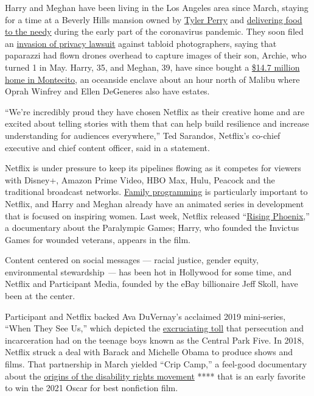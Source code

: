 Harry and Meghan have been living in the Los Angeles area since March,
staying for a time at a Beverly Hills mansion owned by
\href{https://www.nytimes3xbfgragh.onion/2019/02/28/movies/tyler-perry-madea.html}{Tyler
Perry} and
\href{https://www.latimes.com/entertainment-arts/story/2020-04-16/prince-harry-meghan-meals-archie-coronavirus}{delivering
food to the needy} during the early part of the coronavirus pandemic.
They soon filed an
\href{https://twitter.com/eriqgardner/status/1286426962974715906?s=20}{invasion
of privacy lawsuit} against tabloid photographers, saying that paparazzi
had flown drones overhead to capture images of their son, Archie, who
turned 1 in May. Harry, 35, and Meghan, 39, have since bought a
\href{https://variety.com/2020/dirt/heirs-heiresses/meghan-markle-prince-harry-buy-14-7-million-montecito-compound-1234733871/}{\$14.7
million home in Montecito}, an oceanside enclave about an hour north of
Malibu where Oprah Winfrey and Ellen DeGeneres also have estates.

``We're incredibly proud they have chosen Netflix as their creative home
and are excited about telling stories with them that can help build
resilience and increase understanding for audiences everywhere,'' Ted
Sarandos, Netflix's co-chief executive and chief content officer, said
in a statement.

Netflix is under pressure to keep its pipelines flowing as it competes
for viewers with Disney+, Amazon Prime Video, HBO Max, Hulu, Peacock and
the traditional broadcast networks.
\href{https://www.nytimes3xbfgragh.onion/2019/10/11/business/media/netflix-children-movies-streaming.html}{Family
programming} is particularly important to Netflix, and Harry and Meghan
already have an animated series in development that is focused on
inspiring women. Last week, Netflix released
``\href{https://www.rottentomatoes.com/m/rising_phoenix}{Rising
Phoenix},'' a documentary about the Paralympic Games; Harry, who founded
the Invictus Games for wounded veterans, appears in the film.

Content centered on social messages --- racial justice, gender equity,
environmental stewardship \emph{---} has been hot in Hollywood for some
time, and Netflix and Participant Media, founded by the eBay billionaire
Jeff Skoll, have been at the center.

Participant and Netflix backed Ava DuVernay's acclaimed 2019
mini-series, ``When They See Us,'' which depicted the
\href{https://www.nytimes3xbfgragh.onion/2019/05/30/arts/television/when-they-see-us-netflix.html}{excruciating
toll} that persecution and incarceration had on the teenage boys known
as the Central Park Five. In 2018, Netflix struck a deal with Barack and
Michelle Obama to produce shows and films. That partnership in March
yielded ``Crip Camp,'' a feel-good documentary about the
\href{https://www.nytimes3xbfgragh.onion/2020/03/24/movies/crip-camp-review.html}{origins
of the disability rights movement} **** that is an early favorite to win
the 2021 Oscar for best nonfiction film.

